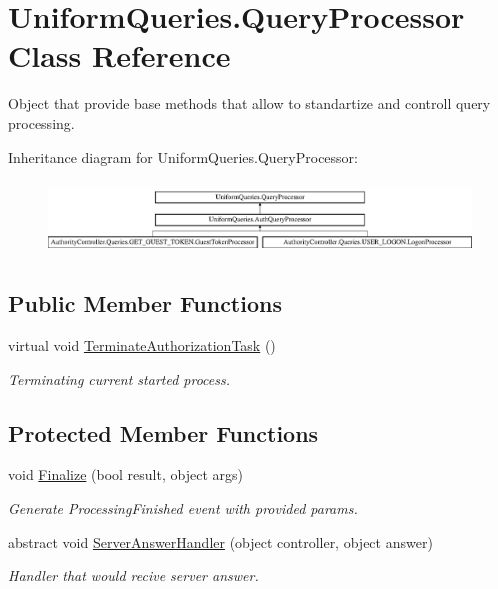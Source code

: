 \hypertarget{class_uniform_queries_1_1_query_processor}{}\section{Uniform\+Queries.\+Query\+Processor Class Reference}
\label{class_uniform_queries_1_1_query_processor}


Object that provide base methods that allow to standartize and controll query processing.  


Inheritance diagram for Uniform\+Queries.\+Query\+Processor\+:\begin{figure}[H]
\begin{center}
\leavevmode
\includegraphics[height=1.962617cm]{df/d1f/class_uniform_queries_1_1_query_processor}
\end{center}
\end{figure}
\subsection*{Public Member Functions}
\begin{DoxyCompactItemize}
\item 
virtual void \mbox{\hyperlink{class_uniform_queries_1_1_query_processor_a5f861d26305129e4b348adc5398aae9f}{Terminate\+Authorization\+Task}} ()
\begin{DoxyCompactList}\small\item\em Terminating current started process. \end{DoxyCompactList}\end{DoxyCompactItemize}
\subsection*{Protected Member Functions}
\begin{DoxyCompactItemize}
\item 
void \mbox{\hyperlink{class_uniform_queries_1_1_query_processor_ad3338c48d35da2f6ddbe2daf736d34a8}{Finalize}} (bool result, object args)
\begin{DoxyCompactList}\small\item\em Generate Processing\+Finished event with provided params. \end{DoxyCompactList}\item 
abstract void \mbox{\hyperlink{class_uniform_queries_1_1_query_processor_ac0726166f2db4a9063024e4db190bd82}{Server\+Answer\+Handler}} (object controller, object answer)
\begin{DoxyCompactList}\small\item\em Handler that would recive server answer. \end{DoxyCompactList}\end{DoxyCompactItemize}
